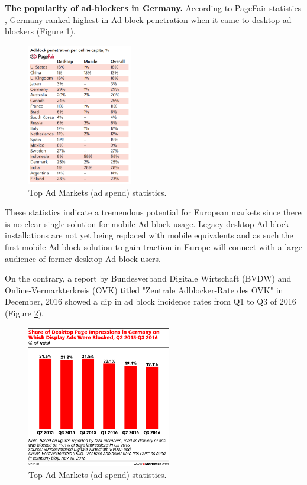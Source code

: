 \documentclass[runningheads,a4paper]{llncs}
\begin{document}
\textbf{The popularity of ad-blockers in Germany.} According to PageFair statistics \cite{popularity2017}, Germany ranked highest in Ad-block penetration when it came to desktop ad-blockers (Figure \ref{fig:popGermany}). \begin{figure}
\centering
\includegraphics[height=6.2cm]{popGermany}
\caption{Top Ad Markets (ad spend) statistics.}
\label{fig:popGermany}
\end{figure}
These statistics indicate a tremendous potential for European markets since there is no clear single solution for mobile Ad-block usage. Legacy desktop Ad-block installations are not yet being replaced with mobile equivalents and as such the first mobile Ad-block solution to gain traction in Europe will connect with a large audience of former desktop Ad-block users.

On the contrary, a report by Bundesverband Digitale Wirtschaft (BVDW) and Online-Vermarkterkreis (OVK) titled  "Zentrale Adblocker-Rate des OVK" \cite{declineGermany} in December, 2016 showed a dip in ad block incidence rates from Q1 to Q3 of 2016 (Figure \ref{fig:declineGermany}). \begin{figure}
\centering
\includegraphics[height=6.2cm]{declineGermany}
\caption{Top Ad Markets (ad spend) statistics.\cite{declineGermany}}
\label{fig:declineGermany}
\end{figure}
\end{document}
